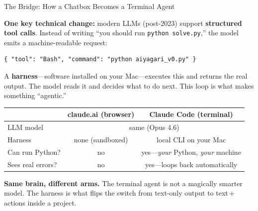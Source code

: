 \documentclass[10pt,english,aspectratio=169]{beamer}
\begin{document}
\begin{frame}[fragile]{The Bridge: How a Chatbox Becomes a Terminal Agent}

\textbf{One key technical change:} modern LLMs (post-2023) support \textbf{structured tool calls}.
Instead of writing ``you should run \texttt{python solve.py},'' the model emits a machine-readable request:

\begin{lstlisting}[style=pythonstyle,language={},basicstyle=\ttfamily\scriptsize,numbers=none]
{ "tool": "Bash", "command": "python aiyagari_v0.py" }
\end{lstlisting}

A \textbf{harness}---software installed on your Mac---executes this and returns the real output. The model reads it and decides what to do next. This loop is what makes something ``agentic.''

\vspace{0.2cm}

\begin{center}
\small
\begin{tabular}{|l|c|c|}
\hline
& \textbf{claude.ai (browser)} & \textbf{Claude Code (terminal)} \\ \hline
LLM model & \multicolumn{2}{c|}{same (Opus 4.6)} \\ \hline
Harness & none (sandboxed) & local CLI on your Mac \\ \hline
Can run Python? & no & yes---\textit{your} Python, \textit{your} machine \\ \hline
Sees real errors? & no & yes---loops back automatically \\ \hline
\end{tabular}
\end{center}

\vspace{0.2cm}

\textbf{Same brain, different arms.} The terminal agent is not a magically smarter model. The harness is what flips the switch from text-only output to text\,+\,actions inside a project.
\end{frame}
\end{document}
